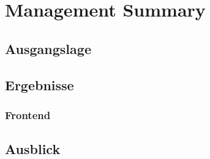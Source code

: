 \chapter*{Management Summary}
\thispagestyle{scrheadings}

\section*{Ausgangslage}

\section*{Ergebnisse}

\subsection*{Frontend}

\section*{Ausblick}
